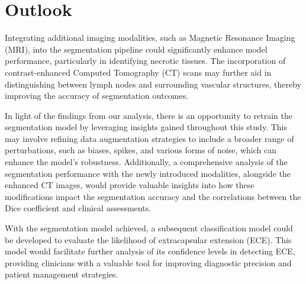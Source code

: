 %
%
%

\chapter{Outlook}

Integrating additional imaging modalities, such as Magnetic Resonance Imaging (MRI), into the segmentation pipeline could significantly enhance model performance, particularly in identifying necrotic tissues. The incorporation of contrast-enhanced Computed Tomography (CT) scans may further aid in distinguishing between lymph nodes and surrounding vascular structures, thereby improving the accuracy of segmentation outcomes.

In light of the findings from our analysis, there is an opportunity to retrain the segmentation model by leveraging insights gained throughout this study. This may involve refining data augmentation strategies to include a broader range of perturbations, such as biases, spikes, and various forms of noise, which can enhance the model's robustness. Additionally, a comprehensive analysis of the segmentation performance with the newly introduced modalities, alongside the enhanced CT images, would provide valuable insights into how these modifications impact the segmentation accuracy and the correlations between the Dice coefficient and clinical assessments.

With the segmentation model achieved, a subsequent classification model could be developed to evaluate the likelihood of extracapsular extension (ECE). This model would facilitate further analysis of its confidence levels in detecting ECE, providing clinicians with a valuable tool for improving diagnostic precision and patient management strategies.



\endinput